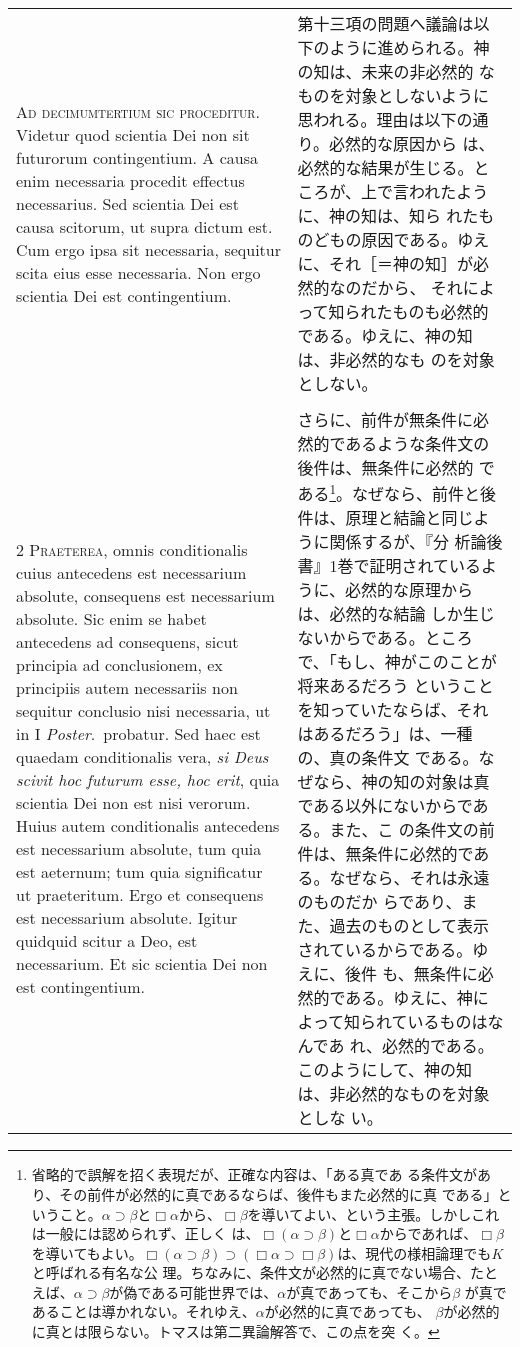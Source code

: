 \documentclass[10pt]{jsarticle} %
\begin{document}
\begin{longtable}{p{21em}p{21em}}


{\huge A}{\scshape d decimumtertium sic proceditur}. Videtur quod
scientia Dei non sit futurorum contingentium. A causa enim necessaria
procedit effectus necessarius. Sed scientia Dei est causa scitorum, ut
supra dictum est. Cum ergo ipsa sit necessaria, sequitur scita eius
esse necessaria. Non ergo scientia Dei est contingentium.

&

第十三項の問題へ議論は以下のように進められる。神の知は、未来の非必然的
なものを対象としないように思われる。理由は以下の通り。必然的な原因から
は、必然的な結果が生じる。ところが、上で言われたように、神の知は、知ら
れたものどもの原因である。ゆえに、それ［＝神の知］が必然的なのだから、
それによって知られたものも必然的である。ゆえに、神の知は、非必然的なも
のを対象としない。

\\
\\

2 {\scshape Praeterea}, omnis conditionalis cuius antecedens est
necessarium absolute, consequens est necessarium absolute. Sic enim se
habet antecedens ad consequens, sicut principia ad conclusionem, ex
principiis autem necessariis non sequitur conclusio nisi necessaria,
ut in I {\itshape Poster}.~probatur. Sed haec est quaedam
conditionalis vera, {\itshape si Deus scivit hoc futurum esse, hoc
erit}, quia scientia Dei non est nisi verorum. Huius autem
conditionalis antecedens est necessarium absolute, tum quia est
aeternum; tum quia significatur ut praeteritum. Ergo et consequens est
necessarium absolute. Igitur quidquid scitur a Deo, est
necessarium. Et sic scientia Dei non est contingentium.


&

さらに、前件が無条件に必然的であるような条件文の後件は、無条件に必然的
である\footnote{省略的で誤解を招く表現だが、正確な内容は、「ある真であ
る条件文があり、その前件が必然的に真であるならば、後件もまた必然的に真
である」ということ。$\alpha \supset \beta$と$\Box \alpha$から、$\Box
\beta$を導いてよい、という主張。しかしこれは一般には認められず、正しく
は、$\Box (\alpha \supset \beta)$と$\Box \alpha$からであれば、$\Box
\beta$を導いてもよい。$\Box (\alpha \supset \beta) \supset (\Box
\alpha \supset \Box \beta)$は、現代の様相論理でも$K$と呼ばれる有名な公
理。ちなみに、条件文が必然的に真でない場合、たとえば、$\alpha \supset
\beta$が偽である可能世界では、$\alpha$が真であっても、そこから$\beta$
が真であることは導かれない。それゆえ、$\alpha$が必然的に真であっても、
$\beta$が必然的に真とは限らない。トマスは第二異論解答で、この点を突
く。}。なぜなら、前件と後件は、原理と結論と同じように関係するが、『分
析論後書』1巻で証明されているように、必然的な原理からは、必然的な結論
しか生じないからである。ところで、「もし、神がこのことが将来あるだろう
ということを知っていたならば、それはあるだろう」は、一種の、真の条件文
である。なぜなら、神の知の対象は真である以外にないからである。また、こ
の条件文の前件は、無条件に必然的である。なぜなら、それは永遠のものだか
らであり、また、過去のものとして表示されているからである。ゆえに、後件
も、無条件に必然的である。ゆえに、神によって知られているものはなんであ
れ、必然的である。このようにして、神の知は、非必然的なものを対象としな
い。


\end{longtable}
\end{document}
